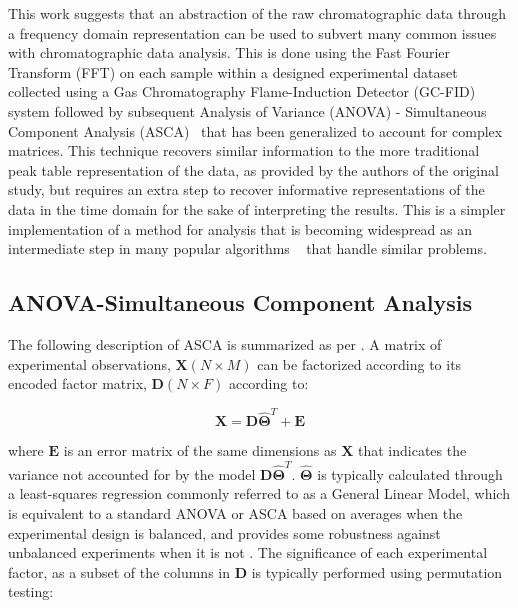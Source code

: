 \documentclass[preprint,12pt]{elsarticle}
\begin{document}
This work suggests that an abstraction of the raw chromatographic data through a frequency domain representation can be used to subvert many common issues with chromatographic data analysis. This is done using the Fast Fourier Transform (FFT) on each sample within a designed experimental dataset collected using a Gas Chromatography Flame-Induction Detector (GC-FID) system followed by subsequent Analysis of Variance (ANOVA) - Simultaneous Component Analysis (ASCA)~\cite{smilde2005anova} that has been generalized to account for complex matrices. This technique recovers similar information to the more traditional peak table representation of the data, as provided by the authors of the original study, but requires an extra step to recover informative representations of the data in the time domain for the sake of interpreting the results. This is a simpler implementation of a method for analysis that is becoming widespread as an intermediate step in many popular algorithms ~\cite{schneide2023shift,schneide2024shift,yu2023parasias} that handle similar problems.


\subsection{ANOVA-Simultaneous Component Analysis}

The following description of ASCA is summarized as per \cite{camacho2023permutation}. A matrix of experimental observations, $\mathbf{X} (N \times M)$ can be factorized according to its encoded factor matrix, $\mathbf{D} (N \times F)$ according to:

\begin{equation}
    \mathbf{X} = \mathbf{D} \mathbf{\hat{\Theta}}^T + \mathbf{E}
\end{equation}

\noindent where $\mathbf{E}$ is an error matrix of the same dimensions as $\mathbf{X}$ that indicates the variance not accounted for by the model $\mathbf{D} \mathbf{\hat{\Theta}}^T$. $\mathbf{\hat{\Theta}}$ is typically calculated through a least-squares regression commonly referred to as a General Linear Model, which is equivalent to a standard ANOVA or ASCA based on averages when the experimental design is balanced, and provides some robustness against unbalanced experiments when it is not \cite{smilde2005anova}. The significance of each experimental factor, as a subset of the columns in $\mathbf{D}$ is typically performed using permutation testing:
\end{document}
